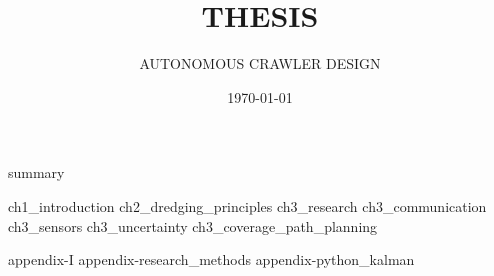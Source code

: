\documentclass[english, businessunit=mti, status=final]{IHCreport}
\title{THESIS}
\subtitle{AUTONOMOUS CRAWLER DESIGN}
\date{\today}
\begin{document}

%
\begin{front}[]
 {summary}
\end{front}

\begin{main}
 {ch1_introduction}
 {ch2_dredging_principles}
 {ch3_research}
 {ch3_communication}
 {ch3_sensors}
 {ch3_uncertainty}
 {ch3_coverage_path_planning}
\end{main}

\begin{back}[]
 \printglossaries
 \printbibliography[title={BIBLIOGRAPHY}]
 \begin{app}
  {appendix-I}
  {appendix-research_methods}
  {appendix-python_kalman}
 \end{app}
\end{back}
\end{document}

